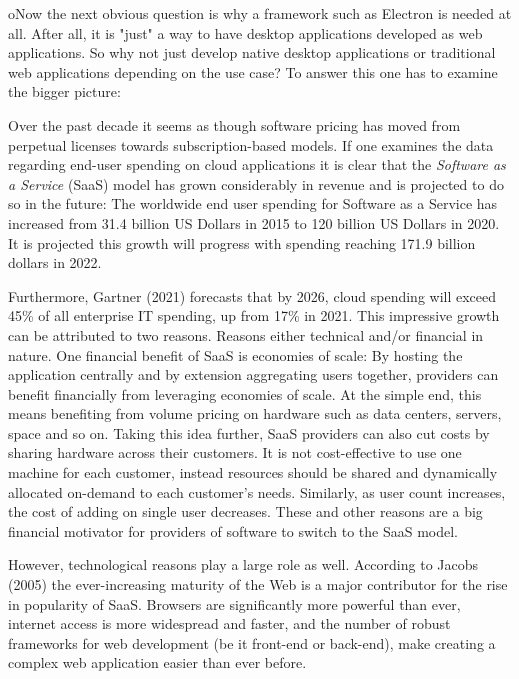 oNow the next obvious question is why a framework such as Electron is needed at all.
After all, it is "just" a way to have desktop applications developed as web applications.
So why not just develop native desktop applications or traditional web applications depending on the use case?
To answer this one has to examine the bigger picture:\par
Over the past decade it seems as though software pricing has moved from perpetual licenses towards subscription-based
models.
If one examines the data regarding end-user spending on cloud applications it is clear that the
\emph{Software as a Service} (SaaS) model has grown considerably in revenue and is projected to do so in the future:
The worldwide end user spending for Software as a Service has increased from 31.4 billion US Dollars in 2015 to 120
billion US Dollars in 2020.
It is projected this growth will progress with spending reaching 171.9 billion dollars in 2022.\cite{gartner2021}\par
Furthermore, Gartner (2021) forecasts that by 2026, cloud spending will exceed 45\% of all enterprise IT spending, up from
17\% in 2021.
This impressive growth can be attributed to two reasons.
Reasons either technical and/or financial in nature.
One financial benefit of SaaS is economies of scale:
By hosting the application centrally and by extension aggregating users together, providers can benefit financially from
leveraging economies of scale.
At the simple end, this means benefiting from volume pricing on hardware such as data centers, servers, space and so on.
Taking this idea further, SaaS providers can also cut costs by sharing hardware across their customers.
It is not cost-effective to use one machine for each customer, instead resources should be shared and dynamically
allocated on-demand to each customer's needs.
Similarly, as user count increases, the cost of adding on single user decreases.
These and other reasons are a big financial motivator for providers of software to switch to the SaaS model.\par
However, technological reasons play a large role as well.
According to Jacobs (2005) the ever-increasing maturity of the Web is a major contributor for the rise in popularity of
SaaS\@.
Browsers are significantly more powerful than ever, internet access is more widespread and faster, and the number
of robust frameworks for web development (be it front-end or back-end), make creating a complex web application easier
than ever before.\cite{akamai2017, statista2021}
